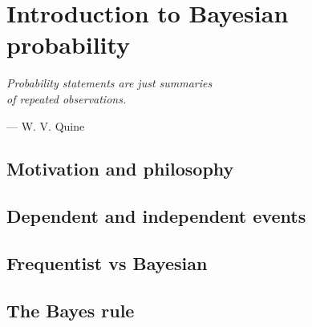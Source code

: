
\chapter{Introduction to Bayesian probability}
\label{chapter6}

\epigraph{\textit{Probability statements are just summaries\\of repeated observations.}}{— W. V. Quine}

\section{Motivation and philosophy}

\section{Dependent and independent events}

\section{Frequentist vs Bayesian}

\section{The Bayes rule}
